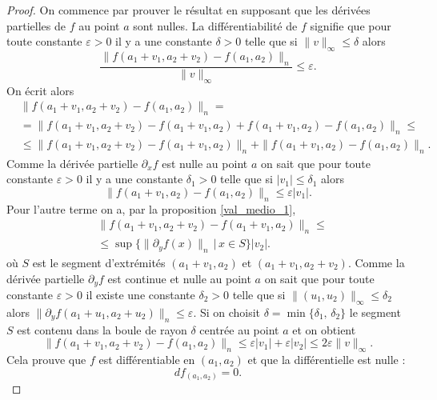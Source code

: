 \begin{proof}
On commence par prouver le résultat en supposant que les dérivées partielles de $f$ au point $a$ sont nulles. La différentiabilité de $f$ signifie que pour toute constante  $\varepsilon> 0$ il y a une constante $\delta>0$ telle que si $\|v\|_\infty\leq \delta $ alors 
\[
\frac{\|f(a_1+v_1, a_2+v_2)-f(a_1, a_2)\|_n}{\|v\|_\infty}\leq \varepsilon. 
\]   
On écrit alors 
\begin{equation}
  \begin{aligned}
   & \|f(a_1+v_1, a_2+v_2)-f(a_1, a_2)\|_n=\\
&=\|f(a_1+v_1, a_2+v_2)-f(a_1+v_1, a_2)+f(a_1+v_1, a_2)-f(a_1, a_2)\|_n\leq\\
&\leq \|f(a_1+v_1, a_2+v_2)-f(a_1+v_1, a_2)\|_n+\|f(a_1+v_1, a_2)-f(a_1, a_2)\|_n.
  \end{aligned}
\end{equation}
Comme la dérivée partielle $\partial_x f$ est  nulle au point $a$  on sait que  pour toute constante  $\varepsilon> 0$ il y a une constante $\delta_1>0$ telle que si $|v_1|\leq \delta_1 $ alors
\[
\|f(a_1+v_1, a_2)-f(a_1, a_2)\|_n\leq \varepsilon |v_1|.
\] 
Pour l'autre terme on a, par la proposition \ref{val_medio_1},
\begin{equation}
  \begin{aligned}
   & \|f(a_1+v_1, a_2+v_2)-f(a_1+v_1, a_2)\|_n\leq \\
&\leq \sup\{\|\partial_yf(x)\|_n\,\vert\, x\in S\}|v_2|.
  \end{aligned}
\end{equation}
où $S$ est le segment d'extrémités  $(a_1+v_1, a_2)$ et $ (a_1+v_1, a_2+v_2)$. Comme la  dérivée partielle $\partial_y f$ est continue et nulle au point $a$ on sait que  pour toute constante  $\varepsilon> 0$ il existe une constante $\delta_2>0$ telle que si $\|(u_1,u_2)\|_\infty\leq \delta_2 $ alors $\|\partial_yf(a_1+u_1,a_2+u_2)\|_n\leq \varepsilon$. Si on choisit $\delta = \min\{\delta_1,\,\delta_2\}$ le segment $S$ est contenu dans la boule de rayon $\delta$ centrée au point $a$ et on obtient
\[
 \|f(a_1+v_1, a_2+v_2)-f(a_1, a_2)\|_n\leq \varepsilon |v_1|+\varepsilon |v_2|\leq 2\varepsilon \|v\|_\infty.
\]
Cela prouve que \( f\) est différentiable en \( (a_1,a_2)\) et que la différentielle est nulle :
\begin{equation}
    df_{(a_1,a_2)}=0.
\end{equation}


\end{proof}
